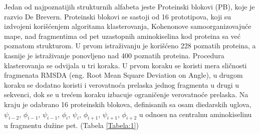 \documentclass[a4paper,12pt]{article}
\begin{document}
Jedan od najpoznatijih strukturnih alfabeta jeste Proteinski blokovi (PB), koje je razvio De Brevern. Proteinski blokovi se sastoji od 16 prototipova, koji su izdvojeni korišćenjem algoritama klasterovanja, Kohenonove samoorganizovajuće mape, nad fragmentima od pet uzastopnih aminokiselina kod proteina sa već poznatom strukturom. U prvom istraživanju je korišćeno 228 poznatih proteina, a kasnije je istraživanje ponovljeno nad 400 poznatih proteina. Procedura klasterovanja se odvijala u tri koraka. U prvom koraku se koristi mera sličnosti fragmenata RMSDA (eng. Root Mean Square Deviation on Angle), u drugom koraku se dodatno koristi i verovatnoća prelaska jednog fragmenta u drugi u sekvenci, dok se u trećem koraku izbacuje ograničenje verovatnoće prelaska. Na kraju je odabrano 16 proteinskih blokova, definisanih sa osam diedarskih uglova, $\psi_{i-2}$, $\phi_{i-1}$, $\psi_{i-1}$, $\phi_i$, $\psi_i$, $\phi_{i+1}$, $\psi_{i+1}$, $\phi_{i+2}$ u odnosu na centralnu aminokiselinu u fragmentu dužine pet. \cite{joseph2010biohysrev} (Tabela \ref{Tabela:1})
\\
\end{document}

